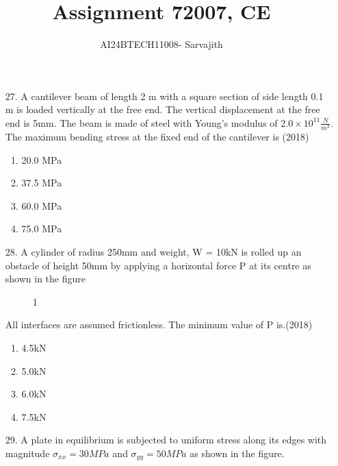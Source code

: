 \documentclass[journal]{IEEEtran}
\begin{document}

\vspace{3cm}


\author{AI24BTECH11008- Sarvajith
}
\title{Assignment 7}
{\let\newpage\relax\maketitle}
\title{2007, CE}
\renewcommand{\thefigure}{\theenumi}
\renewcommand{\thetable}{\theenumi}
\setlength{\intextsep}{10pt} %
\renewcommand{\thetable}{\theenumi}
\begin{enumerate}
    \item[27.] A cantilever beam of length 2 m with a square section of side length 0.1 m is loaded vertically at the free end. The vertical displacement at the free end is 5mm. The beam is made of steel with Young's modulus of $2.0\times 10^{11}\frac{N}{m^2}$. The maximum bending stress at the fixed end of the cantilever is \hfill (2018)
    \begin{enumerate}[label=(\Alph*)]
        \item 20.0 MPa
        \item 37.5 MPa
        \item 60.0 MPa
        \item 75.0 MPa
    \end{enumerate}
    \item[28.] A cylinder of radius 250mm and weight, W = 10kN is rolled up an obstacle of height 50mm by applying a horizontal force P at its centre as shown in the figure
    \begin{figure}[!ht]
        \centering
        \caption{1}
    \end{figure}
    All interfaces are assumed frictionless. The minimum value of P is.\hfill (2018)
    \begin{enumerate}[label=(\Alph*)]
        \item 4.5kN
        \item 5.0kN
        \item 6.0kN
        \item 7.5kN
    \end{enumerate}
    \item[29.] A plate in equilibrium is subjected to uniform stress along its edges with magnitude $\sigma_{xx}=30MPa$ and $\sigma_{yy}=50MPa$ as shown in the figure.

\end{enumerate}
\end{document}

